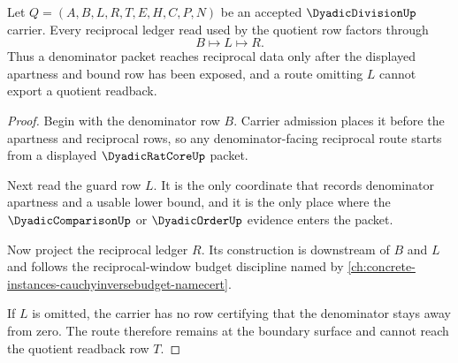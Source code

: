 
\begin{theorem}
\label{thm:dyadic-division-nonzero-reciprocal-route}
Let $Q=(A,B,L,R,T,E,H,C,P,N)$ be an accepted $\DyadicDivisionUp$ carrier. Every reciprocal ledger read used by the quotient row factors through
$$
B \longmapsto L \longmapsto R .
$$
Thus a denominator packet reaches reciprocal data only after the displayed apartness and bound row has been exposed, and a route omitting $L$ cannot export a quotient readback.
\end{theorem}
\begin{proof}
Begin with the denominator row $B$. Carrier admission places it before the apartness and reciprocal rows, so any denominator-facing reciprocal route starts from a displayed $\DyadicRatCoreUp$ packet.

Next read the guard row $L$. It is the only coordinate that records denominator apartness and a usable lower bound, and it is the only place where the $\DyadicComparisonUp$ or $\DyadicOrderUp$ evidence enters the packet.

Now project the reciprocal ledger $R$. Its construction is downstream of $B$ and $L$ and follows the reciprocal-window budget discipline named by \autoref{ch:concrete-instances-cauchyinversebudget-namecert}.

If $L$ is omitted, the carrier has no row certifying that the denominator stays away from zero. The route therefore remains at the boundary surface and cannot reach the quotient readback row $T$.
\end{proof}

